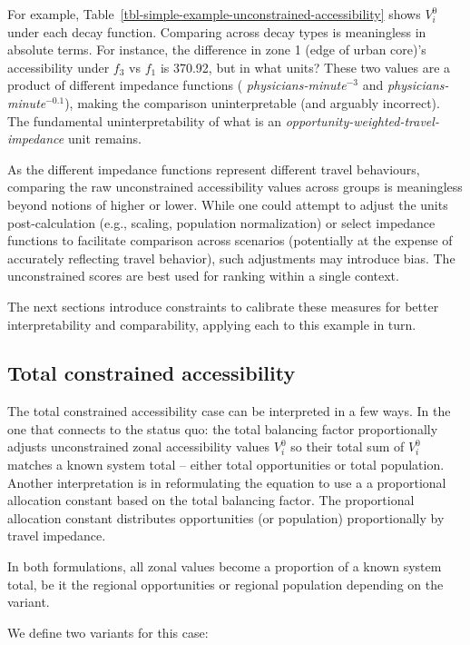 \documentclass[
  10pt,
  letterpaper,
]{article}
\begin{document}
For example, Table~\ref{tbl-simple-example-unconstrained-accessibility}
shows \(V^0_{i}\) under each decay function. Comparing across decay
types is meaningless in absolute terms. For instance, the difference in
zone 1 (edge of urban core)'s accessibility under \(f_3\) vs \(f_1\) is
370.92, but in what units? These two values are a product of different
impedance functions ( \emph{physicians-minute\(^{-3}\)} and
\emph{physicians-minute\(^{-0.1}\)}), making the comparison
uninterpretable (and arguably incorrect). The fundamental
uninterpretability of what is an
\emph{opportunity-weighted-travel-impedance} unit remains.

As the different impedance functions represent different travel
behaviours, comparing the raw unconstrained accessibility values across
groups is meaningless beyond notions of higher or lower. While one could
attempt to adjust the units post-calculation (e.g., scaling, population
normalization) or select impedance functions to facilitate comparison
across scenarios (potentially at the expense of accurately reflecting
travel behavior), such adjustments may introduce bias. The unconstrained
scores are best used for ranking within a single context.

The next sections introduce constraints to calibrate these measures for
better interpretability and comparability, applying each to this example
in turn.

\subsection{Total constrained
accessibility}\label{total-constrained-accessibility}

The total constrained accessibility case can be interpreted in a few
ways. In the one that connects to the status quo: the total balancing
factor proportionally adjusts unconstrained zonal accessibility values
\(V^0_i\) so their total sum of \(V^0_i\) matches a known system total
-- either total opportunities or total population. Another
interpretation is in reformulating the equation to use a a proportional
allocation constant based on the total balancing factor. The
proportional allocation constant distributes opportunities (or
population) proportionally by travel impedance.

In both formulations, all zonal values become a proportion of a known
system total, be it the regional opportunities or regional population
depending on the variant.

We define two variants for this case:
\end{document}
